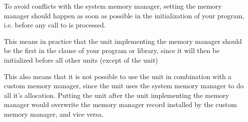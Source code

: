 To avoid conflicts with the system memory manager, setting the memory
manager should happen as soon as possible in the initialization of your
program, i.e. before any call to  is processed.

This means in practice that the unit implementing the memory manager should
be the first in the  clause of your program or library, since it
will then be initialized before all other units (except of the  unit)

This also means that it is not possible to use the  unit in
combination with a custom memory manager, since the  unit uses
the system memory manager to do all it's allocation. Putting the
 unit after the unit implementing the memory manager would
overwrite the memory manager record installed by the custom memory manager,
and vice versa.


